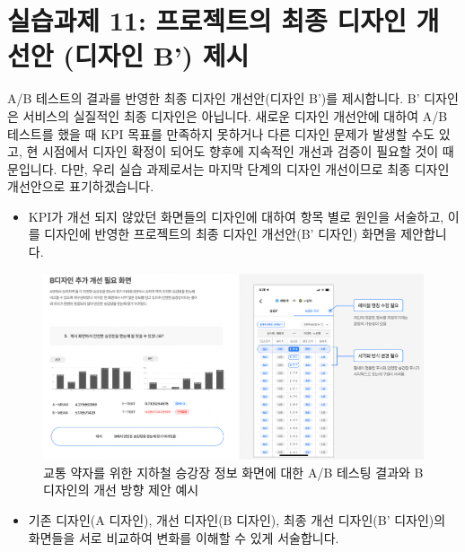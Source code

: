 \documentclass[
  letterpaper,
]{book}
\providecommand{\tightlist}{%
  \setlength{\itemsep}{0pt}\setlength{\parskip}{0pt}}\usepackage{longtable,booktabs,array}
\begin{document}
\section{실습과제 11: 프로젝트의 최종 디자인 개선안 (디자인 B')
제시}\label{uxc2e4uxc2b5uxacfcuxc81c-11-uxd504uxb85cuxc81duxd2b8uxc758-uxcd5cuxc885-uxb514uxc790uxc778-uxac1cuxc120uxc548-uxb514uxc790uxc778-b-uxc81cuxc2dc}

A/B 테스트의 결과를 반영한 최종 디자인 개선안(디자인 B')를 제시합니다.
B' 디자인은 서비스의 실질적인 최종 디자인은 아닙니다. 새로운 디자인
개선안에 대하여 A/B 테스트를 했을 때 KPI 목표를 만족하지 못하거나 다른
디자인 문제가 발생할 수도 있고, 현 시점에서 디자인 확정이 되어도 향후에
지속적인 개선과 검증이 필요할 것이 때문입니다. 다만, 우리 실습
과제로서는 마지막 단계의 디자인 개선이므로 최종 디자인 개선안으로
표기하겠습니다.

\begin{itemize}
\tightlist
\item
  KPI가 개선 되지 않았던 화면들의 디자인에 대하여 항목 별로 원인을
  서술하고, 이를 디자인에 반영한 프로젝트의 최종 디자인 개선안(B'
  디자인) 화면을 제안합니다.
\end{itemize}

\begin{figure}[H]

{\centering \includegraphics{img/fig32.png}

}

\caption{교통 약자를 위한 지하철 승강장 정보 화면에 대한 A/B 테스팅
결과와 B 디자인의 개선 방향 제안 예시}

\end{figure}%

\begin{itemize}
\tightlist
\item
  기존 디자인(A 디자인), 개선 디자인(B 디자인), 최종 개선 디자인(B'
  디자인)의 화면들을 서로 비교하여 변화를 이해할 수 있게 서술합니다.
\end{itemize}
\end{document}
